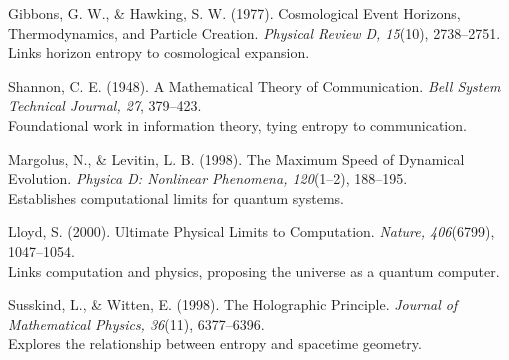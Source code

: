 \documentclass[12pt]{article}
\begin{document}
\begin{thebibliography}{99}
Gibbons, G. W., \& Hawking, S. W. (1977). Cosmological Event Horizons, Thermodynamics, and Particle Creation. \textit{Physical Review D, 15}(10), 2738–2751. \\
Links horizon entropy to cosmological expansion.

Shannon, C. E. (1948). A Mathematical Theory of Communication. \textit{Bell System Technical Journal, 27}, 379–423. \\
Foundational work in information theory, tying entropy to communication.

Margolus, N., \& Levitin, L. B. (1998). The Maximum Speed of Dynamical Evolution. \textit{Physica D: Nonlinear Phenomena, 120}(1–2), 188–195. \\
Establishes computational limits for quantum systems.

Lloyd, S. (2000). Ultimate Physical Limits to Computation. \textit{Nature, 406}(6799), 1047–1054. \\
Links computation and physics, proposing the universe as a quantum computer.

Susskind, L., \& Witten, E. (1998). The Holographic Principle. \textit{Journal of Mathematical Physics, 36}(11), 6377–6396. \\
Explores the relationship between entropy and spacetime geometry.

\end{thebibliography}
\end{document}
